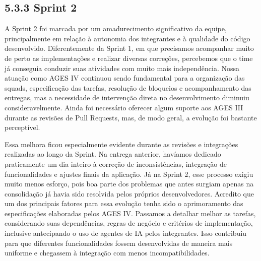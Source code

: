 \hypertarget{__RefHeading___Toc4849_3118176633}{}
\subsection*{5.3.3 Sprint 2}
\label{ages-iv:text-h-0119}

\indent A Sprint 2 foi marcada por um amadurecimento significativo da equipe, principalmente em relação à autonomia dos integrantes e à qualidade do código desenvolvido. Diferentemente da Sprint 1, em que precisamos acompanhar muito de perto as implementações e realizar diversas correções, percebemos que o time já conseguia conduzir suas atividades com muito mais independência. Nossa atuação como AGES IV continuou sendo fundamental para a organização das squads, especificação das tarefas, resolução de bloqueios e acompanhamento das entregas, mas a necessidade de intervenção direta no desenvolvimento diminuiu consideravelmente. Ainda foi necessário oferecer algum suporte aos AGES III durante as revisões de Pull Requests, mas, de modo geral, a evolução foi bastante perceptível.\par

\indent Essa melhora ficou especialmente evidente durante as revisões e integrações realizadas ao longo da Sprint. Na entrega anterior, havíamos dedicado praticamente um dia inteiro à correção de inconsistências, integração de funcionalidades e ajustes finais da aplicação. Já na Sprint 2, esse processo exigiu muito menos esforço, pois boa parte dos problemas que antes surgiam apenas na consolidação já havia sido resolvida pelos próprios desenvolvedores. Acredito que um dos principais fatores para essa evolução tenha sido o aprimoramento das especificações elaboradas pelos AGES IV. Passamos a detalhar melhor as tarefas, considerando suas dependências, regras de negócio e critérios de implementação, inclusive antecipando o uso de agentes de IA pelos integrantes. Isso contribuiu para que diferentes funcionalidades fossem desenvolvidas de maneira mais uniforme e chegassem à integração com menos incompatibilidades.\par

